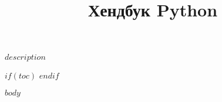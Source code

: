 \documentclass{article}
\title{Хендбук Python}
\begin{document}
    \begin{center}
        \maketitle
        \large $description$
    \end{center}

    \clearpage
    $if(toc)$
        \tableofcontents
        \newpage
    $endif$

    \clearpage
    $body$
\end{document}
